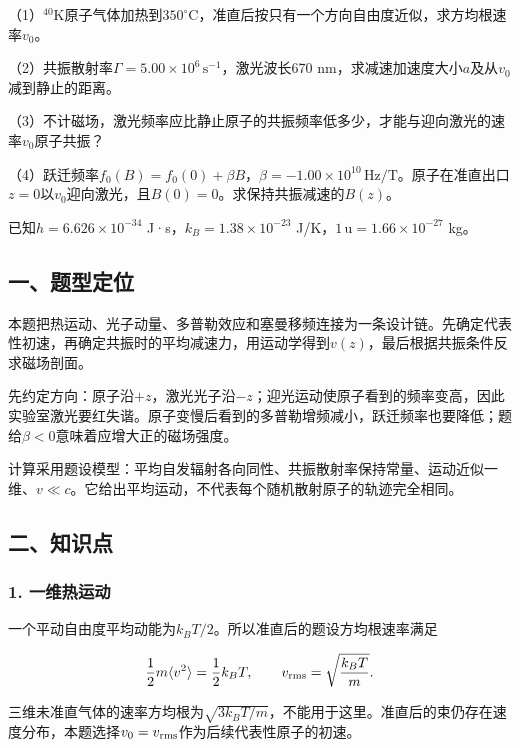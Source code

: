 \documentclass[12pt,a4paper,fontset=fandol]{ctexart}
\begin{document}
（1）\(^{40}\mathrm K\)原子气体加热到\(350^\circ\)C，准直后按只有一个方向自由度近似，求方均根速率\(v_0\)。

（2）共振散射率\(\Gamma=5.00\times10^6\,\mathrm{s^{-1}}\)，激光波长670
nm，求减速加速度大小\(a\)及从\(v_0\)减到静止的距离。

（3）不计磁场，激光频率应比静止原子的共振频率低多少，才能与迎向激光的速率\(v_0\)原子共振？

（4）跃迁频率\(f_0(B)=f_0(0)+\beta B\)，\(\beta=-1.00\times10^{10}\,\mathrm{Hz/T}\)。原子在准直出口\(z=0\)以\(v_0\)迎向激光，且\(B(0)=0\)。求保持共振减速的\(B(z)\)。

已知\(h=6.626\times10^{-34}\) J·s，\(k_B=1.38\times10^{-23}\)
J/K，\(1\,\mathrm u=1.66\times10^{-27}\) kg。

\subsection{一、题型定位}\label{ux4e00ux9898ux578bux5b9aux4f4d-4}

本题把热运动、光子动量、多普勒效应和塞曼移频连接为一条设计链。先确定代表性初速，再确定共振时的平均减速力，用运动学得到\(v(z)\)，最后根据共振条件反求磁场剖面。

先约定方向：原子沿\(+z\)，激光光子沿\(-z\)；迎光运动使原子看到的频率变高，因此实验室激光要红失谐。原子变慢后看到的多普勒增频减小，跃迁频率也要降低；题给\(\beta<0\)意味着应增大正的磁场强度。

计算采用题设模型：平均自发辐射各向同性、共振散射率保持常量、运动近似一维、\(v\ll c\)。它给出平均运动，不代表每个随机散射原子的轨迹完全相同。

\subsection{二、知识点}\label{ux4e8cux77e5ux8bc6ux70b9-4}

\subsubsection{1. 一维热运动}\label{ux4e00ux7ef4ux70edux8fd0ux52a8}

一个平动自由度平均动能为\(k_BT/2\)。所以准直后的题设方均根速率满足

\[
\frac12m\langle v^2\rangle=\frac12k_BT,
\qquad v_{\rm rms}=\sqrt{\frac{k_BT}{m}}.
\]

三维未准直气体的速率方均根为\(\sqrt{3k_BT/m}\)，不能用于这里。准直后的束仍存在速度分布，本题选择\(v_0=v_{\rm rms}\)作为后续代表性原子的初速。
\end{document}
